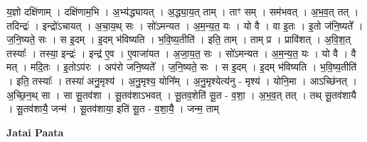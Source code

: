 \documentclass[17pt]{extarticle}
\begin{document}
य॒ज्ञो दक्षि॑णाम् । दक्षि॑णाम॒भि । अ॒भ्य॑द्ध्यायत् । अ॒द्ध्या॒य॒त् ताम् । ताꣳ सम् । सम॑भवत् । अ॒भ॒व॒त् तत् । तदिन्द्रः॑ । इन्द्रो॑ऽचायत् । अ॒चा॒य॒थ् सः । सो॑ऽमन्यत । अ॒म॒न्य॒त॒ यः । यो वै । वा इ॒तः । इ॒तो ज॑नि॒ष्यते᳚ । ज॒नि॒ष्यते॒ सः । स इ॒दम् । इ॒दम् भ॑विष्यति । भ॒वि॒ष्य॒तीति॑ । इति॒ ताम् । ताम् प्र । प्रावि॑शत् । अ॒वि॒श॒त् तस्याः᳚ । तस्या॒ इन्द्रः॑ । इन्द्र॑ ए॒व । ए॒वाजा॑यत । अ॒जा॒य॒त॒ सः । सो॑ऽमन्यत । अ॒म॒न्य॒त॒ यः । यो वै । वै मत् । मदि॒तः । इ॒तोऽप॑रः । अप॑रो जनि॒ष्यते᳚ । ज॒नि॒ष्यते॒ सः । स इ॒दम् । इ॒दम् भ॑विष्यति । भ॒वि॒ष्य॒तीति॑ । इति॒ तस्याः᳚ । तस्या॑ अनु॒मृश्य॑ । अ॒नु॒मृश्य॒ योनि᳚म् । अ॒नु॒मृश्येत्य॑नु - मृश्य॑ । योनि॒मा । आऽच्छि॑नत् । अ॒च्छि॒न॒थ् सा । सा सू॒तव॑शा । सू॒तव॑शाऽभवत् । सू॒तव॒शेति॑ सू॒त - व॒शा॒ । अ॒भ॒व॒त् तत् । तथ् सू॒तव॑शायै । सू॒तव॑शायै॒ जन्म॑ । सू॒तव॑शाया॒ इति॑ सू॒त - व॒शा॒यै॒ । जन्म॒ ताम् \newline

\textbf{Jatai Paata} \newline
\end{document}
